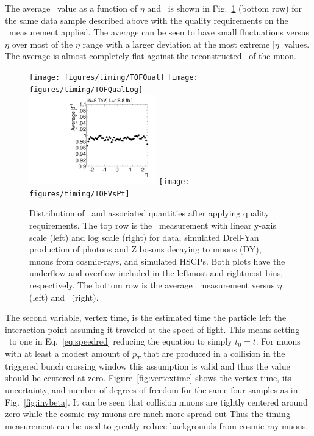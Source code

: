 The average \invbeta\ value as a function of $\eta$ and \pt\ is shown in Fig.~\ref{fig:invbetaQual} (bottom row) for the same data sample described above
with the quality requirements on the \invbeta\ measurement applied.
The average can be seen to have small fluctuations versus $\eta$ over most of the $\eta$ range with a larger deviation at the most extreme $|\eta|$ values.
The average is almost completely flat against the reconstructed \pt\ of the muon.

\begin{figure}
  \begin{center}
      \texttt{[image: figures/timing/TOFQual]}
      \texttt{[image: figures/timing/TOFQualLog]} \\
      \includegraphics[width=0.49\textwidth]{figures/timing/TOFVsEta}
      \texttt{[image: figures/timing/TOFVsPt]} \\
      \caption[Distribution of \invbeta\ and associated quantities after applying quality requirements]
      {Distribution of \invbeta\ and associated quantities after applying quality requirements. 
The top row is the \invbeta\ measurement with linear y-axis scale (left) and log scale (right) for data,
simulated Drell-Yan production of photons and Z bosons decaying to muons (DY), muons from cosmic-rays, and simulated HSCPs.
Both plots have the underflow and overflow included in the leftmost and rightmost bins, respectively.
The bottom row is the average \invbeta\ measurement versus $\eta$ (left) and \pt\ (right).
        }
      \label{fig:invbetaQual}
  \end{center}
\end{figure}

The second variable, vertex time, is the estimated time the particle 
left the interaction point assuming it traveled at the speed of light.
This means setting \invbeta\ to one in Eq.~\ref{eq:speedred} reducing the equation to simply $t_0 = t$. 
For muons with at least a modest amount of $p_T$ that are produced in a collision in the triggered bunch crossing window this assumption is valid and thus the
value should be centered at zero. Figure~\ref{fig:vertextime} shows the vertex time, its uncertainty, and number of degrees of freedom
for the same four samples as in Fig.~\ref{fig:invbeta}. It can be seen that collision muons are tightly centered around zero while the cosmic-ray muons
are much more spread out Thus the timing measurement can be used to greatly reduce backgrounds from cosmic-ray muons. 

